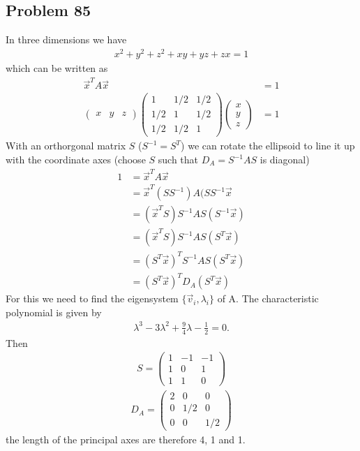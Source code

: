 \documentclass[10pt,a4paper]{book}
\theoremstyle{definition}
\begin{document}
\subsection{Problem 85}
In three dimensions we have
\begin{align}
    x^2+y^2+z^2+xy+yz+zx=1
\end{align}
which can be written as
\begin{align}
\vec{x}^TA\vec{x}&=1\\
\begin{pmatrix}
x & y & z
\end{pmatrix}
\begin{pmatrix}
1 & 1/2 & 1/2\\
1/2 & 1 & 1/2\\
1/2 & 1/2 & 1
\end{pmatrix}
\begin{pmatrix}
x\\
y\\
z
\end{pmatrix}&=1
\end{align}
With an orthorgonal matrix $S$ ($S^{-1}=S^T$) we can rotate the ellipsoid to line it up with the coordinate axes (choose $S$ such that $D_A=S^{-1}AS$ is diagonal)
\begin{align}
1&=\vec{x}^TA\vec{x}\\
&=\vec{x}^T(SS^{-1})A(SS^{-1}\vec{x}\\
&=(\vec{x}^TS)S^{-1}AS(S^{-1}\vec{x})\\
&=(\vec{x}^TS)S^{-1}AS(S^T\vec{x})\\
&=(S^T\vec{x})^TS^{-1}AS(S^T\vec{x})\\
&=(S^T\vec{x})^TD_A(S^T\vec{x})
\end{align}
For this we need to find the eigensystem $\{\vec{v}_i,\lambda_i\}$ of A. The characteristic polynomial is given by
\begin{align}
    \lambda^3-3\lambda^2+\frac{9}{4}\lambda-\frac{1}{2}=0.
\end{align}
Then
\begin{align}
S=\begin{pmatrix}
1 & -1&-1\\
1 & 0 & 1\\
1 & 1 & 0
\end{pmatrix}
\end{align}
\begin{align}
D_A=\begin{pmatrix}
2 & 0   & 0\\
0 & 1/2 & 0\\
0 & 0   & 1/2
\end{pmatrix}
\end{align}
the length of the principal axes are therefore 4, 1 and 1.
\end{document}
